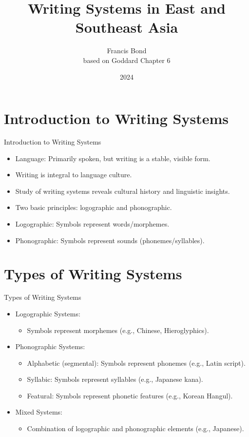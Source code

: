 \documentclass[xetex]{beamer}
\title{Writing Systems in East and Southeast Asia}
\author[Francis Bond]{Francis Bond \\ based on Goddard Chapter 6}
\date{2024}
\begin{document}
\frame{\titlepage}

\section{Introduction to Writing Systems}
\begin{frame}{Introduction to Writing Systems}
\begin{itemize}
    \item Language: Primarily spoken, but writing is a stable, visible form.
    \item Writing is integral to language culture.
    \item Study of writing systems reveals cultural history and linguistic insights.
    \item Two basic principles: logographic and phonographic.
    \item Logographic: Symbols represent words/morphemes.
    \item Phonographic: Symbols represent sounds (phonemes/syllables).
\end{itemize}
\end{frame}

\section{Types of Writing Systems}
\begin{frame}{Types of Writing Systems}
\begin{itemize}
    \item Logographic Systems:
        \begin{itemize}
            \item Symbols represent morphemes (e.g., Chinese, Hieroglyphics).
        \end{itemize}
    \item Phonographic Systems:
        \begin{itemize}
            \item Alphabetic (segmental): Symbols represent phonemes (e.g., Latin script).
            \item Syllabic: Symbols represent syllables (e.g., Japanese kana).
            \item Featural: Symbols represent phonetic features (e.g., Korean Hangul).
        \end{itemize}
    \item Mixed Systems:
        \begin{itemize}
            \item Combination of logographic and phonographic elements (e.g., Japanese).
        \end{itemize}
\end{itemize}
\end{frame}
\end{document}
